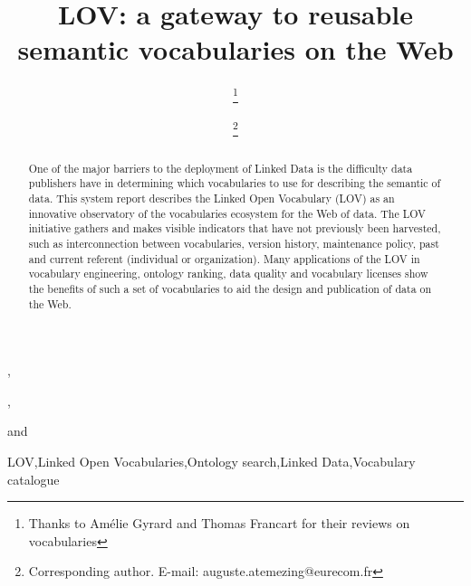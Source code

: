 \documentclass{iosart2c}
\begin{document}
\begin{frontmatter}                        %

%
\title{LOV: a gateway to reusable semantic vocabularies on the Web}




\author[A]{   \thanks{Thanks to Am\'elie Gyrard and Thomas Francart for their reviews on vocabularies}},
\author[B]{ \thanks{Corresponding author. E-mail: auguste.atemezing@eurecom.fr}},
\author[C]{ }
and
\author[D]{ }
\address[A]{Fujitsu (Ireland) Limited, Swords, Co. Dublin, Ireland\\
E-mail: pierre-yves.vandenbussche@ie.fujitsu.com}
\address[B]{Multimedia Communication Department, EURECOM, Campus SophiaTech
450, route des Chappes, 06410 Biot, France\\
E-mail: auguste.atemezing@eurecom.fr}
\address[C]{Ontology Engineering Group (OEG), 
Universidad Polit\'ecnica de Madrid, Madrid, Spain\\
E-mail: mpoveda@fi.upm.es}
\address[D]{Mondeca, 35 boulevard de Strasbourg, 75010 Paris, France
\\
E-mail: bernard.vatant@mondeca.com}


\begin{abstract}
One of the major barriers to the deployment of Linked Data is the difficulty data publishers have in determining which vocabularies to use for describing the semantic of data. This system report describes the Linked Open Vocabulary (LOV) as an innovative observatory of the vocabularies ecosystem for the Web of data. The LOV initiative gathers and makes visible indicators that have not previously been harvested, such as interconnection between vocabularies, version history, maintenance policy, past and current referent (individual or organization). Many applications of the LOV in vocabulary engineering, ontology ranking, data quality and vocabulary licenses show the benefits of such a set of vocabularies to aid the design and publication of data on the Web.
\end{abstract}

\begin{keyword}
LOV\sep Linked Open Vocabularies\sep Ontology search\sep Linked Data\sep Vocabulary catalogue
\end{keyword}

\end{frontmatter}
\end{document}
